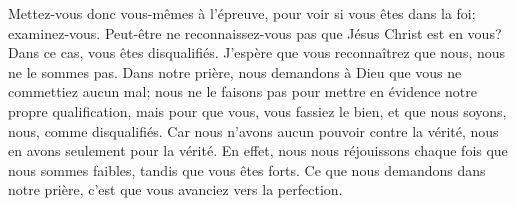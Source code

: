 Mettez-vous donc vous-mêmes à l’épreuve, pour voir si vous êtes dans la foi;
	examinez-vous.
Peut-être ne reconnaissez-vous pas que Jésus Christ est en vous?
	Dans ce cas, vous êtes disqualifiés.
J’espère que vous reconnaîtrez que nous, nous ne le sommes pas.
Dans notre prière, nous demandons à Dieu que vous ne commettiez aucun mal;
	nous ne le faisons pas pour mettre en évidence notre propre qualification,
	mais pour que vous, vous fassiez le bien,
	et que nous soyons, nous, comme disqualifiés.
Car nous n’avons aucun pouvoir contre la vérité,
	nous en avons seulement pour la vérité.
En effet, nous nous réjouissons chaque fois que nous sommes faibles,
	tandis que vous êtes forts.
Ce que nous demandons dans notre prière,
	c’est que vous avanciez vers la perfection.

